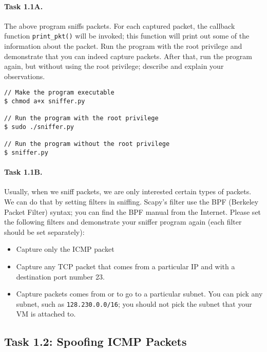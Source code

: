 \paragraph{Task 1.1A.} The above program sniffs packets. For each captured
packet, the callback function \texttt{print\_pkt()} will be invoked; this function will print out some of
the information about the packet. Run the program with the root privilege and demonstrate that
you can indeed capture packets. After that, run the program again, but without using the root
privilege; describe and explain your observations. 
 
\begin{lstlisting}
// Make the program executable 
$ chmod a+x sniffer.py

// Run the program with the root privilege
$ sudo ./sniffer.py

// Run the program without the root privilege
$ sniffer.py
\end{lstlisting}


\paragraph{Task 1.1B.} Usually, when we sniff packets, we are only
interested certain types of packets. We can do that by setting 
filters in sniffing. Scapy's filter use the 
BPF (Berkeley Packet Filter) syntax; you can find the BPF manual 
from the Internet. Please set the following filters and demonstrate 
your sniffer program again (each filter should be set separately):

\begin{itemize} 
 \item Capture only the ICMP packet
 \item Capture any TCP packet that comes from a particular IP and with 
 a destination port number 23. 
 \item Capture packets comes from or to go to a particular subnet. You can
 pick any subnet, such as \texttt{128.230.0.0/16}; you should not 
 pick the subnet that your VM is attached to. 
\end{itemize} 



\subsection{Task 1.2: Spoofing ICMP Packets}

